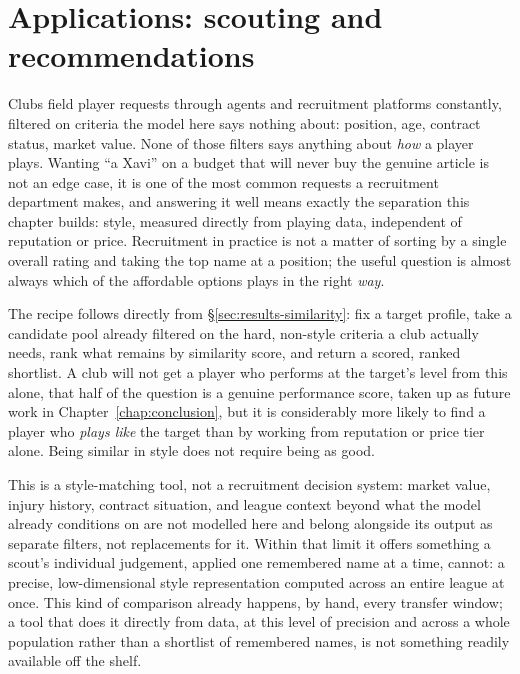 \FloatBarrier

\section{Applications: scouting and recommendations}
\label{sec:results-scouting}

Clubs field player requests through agents and recruitment platforms constantly, filtered on criteria the
model here says nothing about: position, age, contract status, market value. None of those filters says
anything about \emph{how} a player plays. Wanting ``a Xavi'' on a budget that will never buy the genuine
article is not an edge case, it is one of the most common requests a recruitment department makes, and
answering it well means exactly the separation this chapter builds: style, measured directly from playing
data, independent of reputation or price. Recruitment in practice is not a matter of sorting by a single
overall rating and taking the top name at a position; the useful question is almost always which of the
affordable options plays in the right \emph{way}.

The recipe follows directly from \S\ref{sec:results-similarity}: fix a target profile, take a candidate pool
already filtered on the hard, non-style criteria a club actually needs, rank what remains by similarity score,
and return a scored, ranked shortlist. A club will not get a player who performs at the target's level from
this alone, that half of the question is a genuine performance score, taken up as future work in Chapter~\ref{chap:conclusion}, but it is
considerably more likely to find a player who \emph{plays like} the target than by working from reputation or
price tier alone. Being similar in style does not require being as good.

This is a style-matching tool, not a recruitment decision system: market value, injury history, contract
situation, and league context beyond what the model already conditions on are not modelled here and belong
alongside its output as separate filters, not replacements for it. Within that limit it offers something a
scout's individual judgement, applied one remembered name at a time, cannot: a precise, low-dimensional style
representation computed across an entire league at once. This kind of comparison already happens, by hand,
every transfer window; a tool that does it directly from data, at this level of precision and across a whole
population rather than a shortlist of remembered names, is not something readily available off the shelf.
